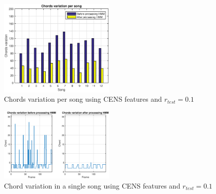 \begin{figure} [h!]
	\includegraphics[width=0.5\textwidth]{img/Result_HMM/SMOOTHING/SmoothPerSongCENS0109}
	\caption{Chords variation per song using CENS features and $r_{test}=0.1$}
	\label{fig:smoothmulti}
\end{figure}

\begin{figure} [h!]
	\includegraphics[width=0.5\textwidth]{img/Result_HMM/SMOOTHING/SmoothSingleSongCENS0109}
	\caption{Chord variation in a single song using CENS features and $r_{test}=0.1$}
	\label{fig:smoothsingle}
\end{figure}
